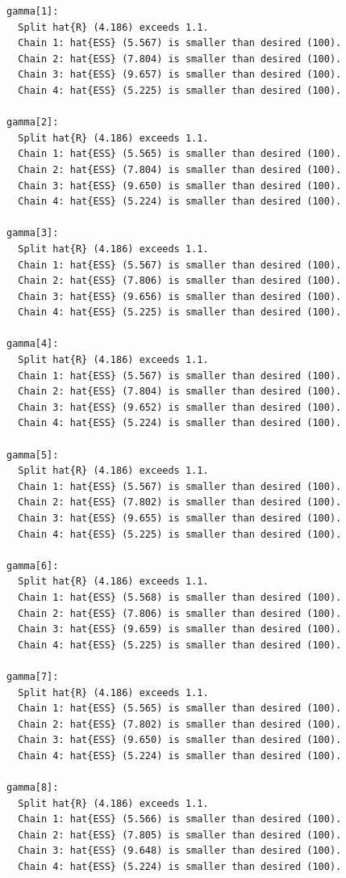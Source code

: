\documentclass[
  letterpaper,
  DIV=11,
  numbers=noendperiod]{scrartcl}
\begin{document}
\begin{verbatim}
gamma[1]:
  Split hat{R} (4.186) exceeds 1.1.
  Chain 1: hat{ESS} (5.567) is smaller than desired (100).
  Chain 2: hat{ESS} (7.804) is smaller than desired (100).
  Chain 3: hat{ESS} (9.657) is smaller than desired (100).
  Chain 4: hat{ESS} (5.225) is smaller than desired (100).

gamma[2]:
  Split hat{R} (4.186) exceeds 1.1.
  Chain 1: hat{ESS} (5.565) is smaller than desired (100).
  Chain 2: hat{ESS} (7.804) is smaller than desired (100).
  Chain 3: hat{ESS} (9.650) is smaller than desired (100).
  Chain 4: hat{ESS} (5.224) is smaller than desired (100).

gamma[3]:
  Split hat{R} (4.186) exceeds 1.1.
  Chain 1: hat{ESS} (5.567) is smaller than desired (100).
  Chain 2: hat{ESS} (7.806) is smaller than desired (100).
  Chain 3: hat{ESS} (9.656) is smaller than desired (100).
  Chain 4: hat{ESS} (5.225) is smaller than desired (100).

gamma[4]:
  Split hat{R} (4.186) exceeds 1.1.
  Chain 1: hat{ESS} (5.567) is smaller than desired (100).
  Chain 2: hat{ESS} (7.804) is smaller than desired (100).
  Chain 3: hat{ESS} (9.652) is smaller than desired (100).
  Chain 4: hat{ESS} (5.224) is smaller than desired (100).

gamma[5]:
  Split hat{R} (4.186) exceeds 1.1.
  Chain 1: hat{ESS} (5.567) is smaller than desired (100).
  Chain 2: hat{ESS} (7.802) is smaller than desired (100).
  Chain 3: hat{ESS} (9.655) is smaller than desired (100).
  Chain 4: hat{ESS} (5.225) is smaller than desired (100).

gamma[6]:
  Split hat{R} (4.186) exceeds 1.1.
  Chain 1: hat{ESS} (5.568) is smaller than desired (100).
  Chain 2: hat{ESS} (7.806) is smaller than desired (100).
  Chain 3: hat{ESS} (9.659) is smaller than desired (100).
  Chain 4: hat{ESS} (5.225) is smaller than desired (100).

gamma[7]:
  Split hat{R} (4.186) exceeds 1.1.
  Chain 1: hat{ESS} (5.565) is smaller than desired (100).
  Chain 2: hat{ESS} (7.802) is smaller than desired (100).
  Chain 3: hat{ESS} (9.650) is smaller than desired (100).
  Chain 4: hat{ESS} (5.224) is smaller than desired (100).

gamma[8]:
  Split hat{R} (4.186) exceeds 1.1.
  Chain 1: hat{ESS} (5.566) is smaller than desired (100).
  Chain 2: hat{ESS} (7.805) is smaller than desired (100).
  Chain 3: hat{ESS} (9.648) is smaller than desired (100).
  Chain 4: hat{ESS} (5.224) is smaller than desired (100).


\end{verbatim}
\end{document}
